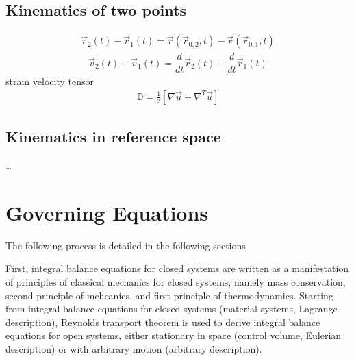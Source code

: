\documentclass[letterpaper,10pt,english]{jupyterBook}
\begin{document}
\section{Kinematics of two points}
\label{\detokenize{ch/continuum/kinematics:kinematics-of-two-points}}\label{\detokenize{ch/continuum/kinematics:kinematics-two-points}}\begin{equation*}
\begin{split}\vec{r}_2(t) - \vec{r}_1(t) = \vec{r}\left(\vec{r}_{0,2}, t \right) - \vec{r}\left(\vec{r}_{0,1}, t \right)\end{split}
\end{equation*}\begin{equation*}
\begin{split}\vec{v}_2(t) - \vec{v}_1(t) = \dfrac{d}{dt} \vec{r}_2(t) - \dfrac{d}{dt} \vec{r}_1(t)\end{split}
\end{equation*}
\sphinxAtStartPar
strain velocity tensor
\begin{equation}\label{equation:ch/continuum/kinematics:eq:strain-vel-tensor}
\begin{split}\mathbb{D} = \frac{1}{2} \left[ \nabla \vec{u} + \nabla^T \vec{u} \right]\end{split}
\end{equation}

\section{Kinematics in reference space}
\label{\detokenize{ch/continuum/kinematics:kinematics-in-reference-space}}\label{\detokenize{ch/continuum/kinematics:kinematics-reference-space}}
\sphinxAtStartPar
…

\sphinxstepscope


\chapter{Governing Equations}
\label{\detokenize{ch/continuum/governing-equations:governing-equations}}\label{\detokenize{ch/continuum/governing-equations:continuum-governing-equations}}\label{\detokenize{ch/continuum/governing-equations::doc}}
\sphinxAtStartPar
The following process is detailed in the following sections

\sphinxAtStartPar
{} First, integral balance equations for closed systems are written as a manifestation of principles of classical mechanics for closed systems, namely mass conservation, second principle of mehcanics, and first principle of thermodynamics. Starting from integral balance equations for closed systems (material systems, Lagrange description), Reynolds transport theorem is used to derive integral balance equations for open systems, either stationary in space (control volume, Eulerian description) or with arbitrary motion (arbitrary description).
\end{document}
